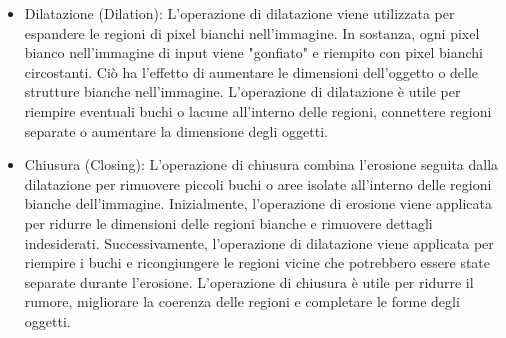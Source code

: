 \documentclass[a4paper,12pt]{report}
\begin{document}
      \begin{itemize}
        \item Dilatazione (Dilation): L'operazione di dilatazione viene utilizzata per \\espandere le regioni di pixel bianchi nell'immagine. In sostanza, ogni pixel bianco nell'immagine di input viene "gonfiato" e riempito con pixel bianchi circostanti. Ciò ha l'effetto di aumentare le dimensioni dell'oggetto o delle strutture bianche nell'immagine. L'operazione di dilatazione è utile per riempire eventuali buchi o lacune all'interno delle regioni, connettere regioni separate o aumentare la dimensione degli oggetti.
        \newpage
        \item Chiusura (Closing): L'operazione di chiusura combina l'erosione seguita dalla dilatazione per rimuovere piccoli buchi o aree isolate all'interno delle regioni bianche dell'immagine. Inizialmente, l'operazione di erosione viene applicata per ridurre le dimensioni delle regioni bianche e rimuovere dettagli indesiderati. Successivamente, l'operazione di dilatazione viene applicata per riempire i buchi e ricongiungere le regioni vicine che potrebbero essere state separate durante l'erosione. L'operazione di chiusura è utile per ridurre il rumore, migliorare la coerenza delle regioni e completare le forme degli oggetti.
      \end{itemize}
\end{document}
